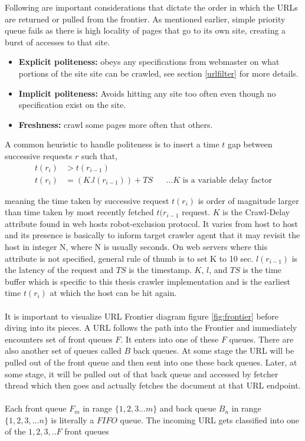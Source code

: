 \pagebreak

\noindent
Following are important considerations that dictate the order in which the URLs are returned or pulled from
the frontier. As mentioned earlier, simple priority queue fails as there is high locality of pages that go
to its own site, creating a burst of accesses to that site.

\begin{itemize}
\item \textbf{Explicit politeness:}\cite{trends} obeys any specifications from webmaster on what portions of the site
  site can be crawled, see section \ref{urlfilter} for more details.
\item \textbf{Implicit politeness:}\cite{trends} Avoids hitting any site too often even though no specification exist
  on the site.
  \item \textbf{Freshness:} crawl some pages more often that others.
\end{itemize}

\noindent
A common heuristic to handle politeness is to insert a time $t$ gap between successive requests $r$ such
that,
\begin{align*}
  t(r_i) &> t(r_{i-1}) \\
  t(r_i) &= (K.l(r_{i-1})) + TS && \text{...$K$ is a variable delay factor}
\end{align*}

\noindent
meaning the time taken by successive request $t(r_i)$ is order of magnitude larger than time taken by
most recently fetched $t(r_{i-1}$ request. $K$ is the Crawl-Delay attribute found in web hosts robot-exclusion protocol. It varies
from host to host and its presence is basically to inform target crawler agent that it may revisit the
host in integer N, where N is usually seconds. On web servers where this attribute is not specified,
general rule of thumb is to set K to 10 sec. $l(r_{i-1})$ is the latency of the request and $TS$ is the
timestamp. $K$, $l$, and $TS$ is the time buffer which is specific to this thesis crawler implementation
and is the earliest time $t(r_i)$ at which the host can be hit again.
\\
\\
\noindent
It is important to visualize URL Frontier diagram figure \ref{fig:frontier} before diving into its pieces. A URL follows the path into the Frontier and immediately encounters set of front queues $F$. It enters into one of these $F$ queues. There are also another set of queues called $B$ back queues. At some stage the URL will be pulled out of the front queue and then sent into one these back queues. Later, at some stage, it will be pulled out of that back queue and accessed by fetcher thread which then goes and actually fetches
the document at that URL endpoint.
\\
\\
\noindent
Each front queue $F_m$ in range $\{1,2,3...m\}$  and back queue $B_n$ in range $\{1,2,3,...n\}$ is literally a $FIFO$ queue. The incoming URL gets classified into one of the ${1,2,3,..F}$ front queues


